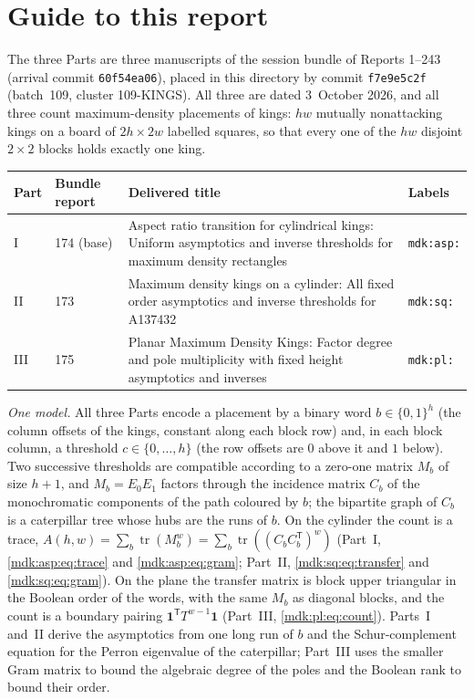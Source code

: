 \documentclass[11pt,letterpaper]{article}
\numberwithin{equation}{section}
\theoremstyle{remark}\newtheorem{remark}[theorem]{Remark}
\DeclareMathOperator{\tr}{tr}\DeclareMathOperator{\TV}{TV}
\newcommand{\one}{\mathbf 1}
\begin{document}
\section*{Guide to this report}\label{mdk:sec:guide}
The three Parts are three manuscripts of the session bundle of Reports 1--243 (arrival commit \texttt{60f54ea06}), placed in this directory by commit \texttt{f7e9e5c2f} (batch~109, cluster 109-KINGS). All three are dated 3~October 2026, and all three count maximum-density placements of kings: $hw$ mutually nonattacking kings on a board of $2h\times2w$ labelled squares, so that every one of the $hw$ disjoint $2\times2$ blocks holds exactly one king.
\begin{center}
\small
\begin{tabular}{@{}l l >{\raggedright\arraybackslash}p{} l@{}}
\toprule
Part & Bundle report & Delivered title & Labels\\
\midrule
I & 174 (base) & Aspect ratio transition for cylindrical kings: Uniform asymptotics and inverse thresholds for maximum density rectangles & \texttt{mdk:asp:}\\
II & 173 & Maximum density kings on a cylinder: All fixed order asymptotics and inverse thresholds for A137432 & \texttt{mdk:sq:}\\
III & 175 & Planar Maximum Density Kings: Factor degree and pole multiplicity with fixed height asymptotics and inverses & \texttt{mdk:pl:}\\
\bottomrule
\end{tabular}
\end{center}
\emph{One model.} All three Parts encode a placement by a binary word $b\in\{0,1\}^h$ (the column offsets of the kings, constant along each block row) and, in each block column, a threshold $c\in\{0,\dots,h\}$ (the row offsets are $0$ above it and $1$ below). Two successive thresholds are compatible according to a zero-one matrix $M_b$ of size $h+1$, and $M_b=E_0E_1$ factors through the incidence matrix $C_b$ of the monochromatic components of the path coloured by $b$; the bipartite graph of $C_b$ is a caterpillar tree whose hubs are the runs of $b$. On the cylinder the count is a trace, $A(h,w)=\sum_b\tr(M_b^w)=\sum_b\tr((C_bC_b^{\mathsf T})^w)$ (Part~I, \eqref{mdk:asp:eq:trace} and \eqref{mdk:asp:eq:gram}; Part~II, \eqref{mdk:sq:eq:transfer} and \eqref{mdk:sq:eq:gram}). On the plane the transfer matrix is block upper triangular in the Boolean order of the words, with the same $M_b$ as diagonal blocks, and the count is a boundary pairing $\one^{\mathsf T}T^{w-1}\one$ (Part~III, \eqref{mdk:pl:eq:count}). Parts~I and~II derive the asymptotics from one long run of $b$ and the Schur-complement equation for the Perron eigenvalue of the caterpillar; Part~III uses the smaller Gram matrix to bound the algebraic degree of the poles and the Boolean rank to bound their order.
\end{document}
